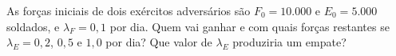 As forças iniciais de dois exércitos adversários são $F_0 = 10.000$ e $E_0 = 5.000$ soldados, e $\lambda_F = 0,1$ por dia. Quem vai ganhar e com quais forças restantes se $\lambda_E = 0,2$, $0,5$ e $1,0$ por dia? Que valor de $\lambda_E$ produziria um empate?
